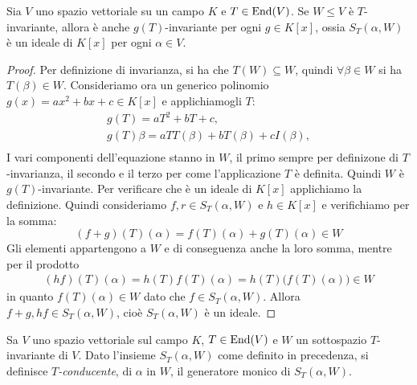 \begin{lemma}
	Sia $V$ uno spazio vettoriale su un campo $K$ e $T\in\operatorname{End}(V)$.
	Se $W\le V$ è $T$-invariante, allora è anche $g(T)$-invariante per ogni $g\in K[x]$, ossia $S_T(\alpha,W)$ è un ideale di $K[x]$ per ogni $\alpha\in V$.
\end{lemma}
\begin{proof}
	Per definizione di invarianza, si ha che $T(W) \subseteq W$, quindi $\forall \beta\in W$ si ha $T(\beta)\in W$.
	Consideriamo ora un generico polinomio $g(x) = a x^2 + b x + c\in K[x]$ e applichiamogli $T$:
	\begin{gather*}
		g(T) = a T^2 + b T + c,\\
		g(T)\beta = a T T(\beta) + b T(\beta) + c I(\beta),\\
	\end{gather*}
	I vari componenti dell'equazione stanno in $W$, il primo sempre per definizone di $T$-invarianza, il secondo e il terzo per come l'applicazione $T$ è definita.
	Quindi $W$ è $g(T)$-invariante.
	Per verificare che è un ideale di $K[x]$ applichiamo la definizione.
	Quindi consideriamo $f,r\in S_T(\alpha,W)$ e $h\in K[x]$ e verifichiamo per la somma:
	\begin{equation*}
		(f + g)(T)(\alpha) = f(T)(\alpha) + g(T)(\alpha)\in W
	\end{equation*}
	Gli elementi appartengono a $W$ e di conseguenza anche la loro somma, mentre per il prodotto
	\begin{gather*}
		(hf)(T)(\alpha) = h(T)f(T)(\alpha) = h(T)\big(f(T)(\alpha)\big)\in W
	\end{gather*}
	in quanto $f(T)(\alpha)\in W$ dato che $f\in S_T(\alpha,W)$.
	Allora $f+g,hf\in S_T(\alpha,W)$, cioè $ S_T(\alpha, W)$ è un ideale.
\end{proof}

\begin{definizione} \label{d:polinomio-conducente}
	Sa $V$ uno spazio vettoriale sul campo $K$, $T\in\operatorname{End}(V)$ e $W$ un sottospazio $T$-invariante di $V$.
	Dato l'insieme $S_T(\alpha,W)$ come definito in precedenza, si definisce \emph{$T$-conducente}, di $\alpha$ in $W$, il generatore monico di $S_T(\alpha,W)$.
\end{definizione}

